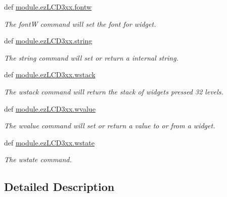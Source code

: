 \begin{DoxyCompactItemize}
def \hyperlink{group___widgets_ga0efc2d431900e2b77a30e19bb556fb3a}{module.\-ez\-L\-C\-D3xx.\-fontw}
\begin{DoxyCompactList}\small\item\em The font\-W command will set the font for widget. \end{DoxyCompactList}\item 
def \hyperlink{group___widgets_gae2b2686b92f93d6fc84de7a19518a89f}{module.\-ez\-L\-C\-D3xx.\-string}
\begin{DoxyCompactList}\small\item\em The string command will set or return a internal string. \end{DoxyCompactList}\item 
def \hyperlink{group___widgets_ga223301539fa77d634fc44b480a08f6a7}{module.\-ez\-L\-C\-D3xx.\-wstack}
\begin{DoxyCompactList}\small\item\em The wstack command will return the stack of widgets pressed 32 levels. \end{DoxyCompactList}\item 
def \hyperlink{group___widgets_ga57c35a2e95d92bbeaeefc71ffd9998fc}{module.\-ez\-L\-C\-D3xx.\-wvalue}
\begin{DoxyCompactList}\small\item\em The wvalue command will set or return a value to or from a widget. \end{DoxyCompactList}\item 
def \hyperlink{group___widgets_ga68f19c87c7284b550f150b81327125aa}{module.\-ez\-L\-C\-D3xx.\-wstate}
\begin{DoxyCompactList}\small\item\em The wstate command. \end{DoxyCompactList}\end{DoxyCompactItemize}


\subsection{Detailed Description}


